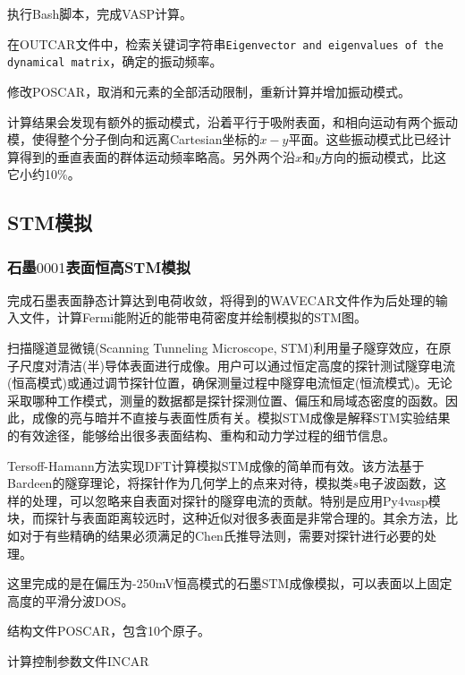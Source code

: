 执行\textrm{Bash}脚本，完成\textrm{VASP}计算。

在\textrm{OUTCAR}文件中，检索关键词字符串\texttt{Eigenvector and eigenvalues of the dynamical matrix}，确定的振动频率。

修改\textrm{POSCAR}，取消和元素的全部活动限制，重新计算并增加振动模式。

计算结果会发现有额外的振动模式，沿着平行于吸附表面，和相向运动有两个振动模，使得整个分子倒向和远离\textrm{Cartesian}坐标的$x-y$平面。这些振动模式比已经计算得到的垂直表面的群体运动频率略高。另外两个沿$x$和$y$方向的振动模式，比这它小约10\%。

\subsection{\rm{STM}模拟}
\subsubsection{石墨$0001$表面恒高\textrm{STM}模拟}
完成石墨表面静态计算达到电荷收敛，将得到的\textrm{WAVECAR}文件作为后处理的输入文件，计算\textrm{Fermi}能附近的能带电荷密度并绘制模拟的\textrm{STM}图。

扫描隧道显微镜\textrm{(Scanning Tunneling Microscope, STM)}利用量子隧穿效应，在原子尺度对清洁(半)导体表面进行成像。用户可以通过恒定高度的探针测试隧穿电流(恒高模式)或通过调节探针位置，确保测量过程中隧穿电流恒定(恒流模式)。无论采取哪种工作模式，测量的数据都是探针探测位置、偏压和局域态密度的函数。因此，成像的亮与暗并不直接与表面性质有关。模拟\textrm{STM}成像是解释\textrm{STM}实验结果的有效途径，能够给出很多表面结构、重构和动力学过程的细节信息。

\textrm{Tersoff-Hamann}方法实现\textrm{DFT}计算模拟\textrm{STM}成像的简单而有效。该方法基于\textrm{Bardeen}的隧穿理论，将探针作为几何学上的点来对待，模拟类$s$电子波函数，这样的处理，可以忽略来自表面对探针的隧穿电流的贡献。特别是应用\textrm{Py4vasp}模块，而探针与表面距离较远时，这种近似对很多表面是非常合理的。其余方法，比如对于有些精确的结果必须满足的\textrm{Chen}氏推导法则，需要对探针进行必要的处理。

这里完成的是在偏压为\textrm{-250mV}恒高模式的石墨\textrm{STM}成像模拟，可以表面以上固定高度的平滑分波\textrm{DOS}。

结构文件\textrm{POSCAR}，包含10个原子。

计算控制参数文件\textrm{INCAR}

